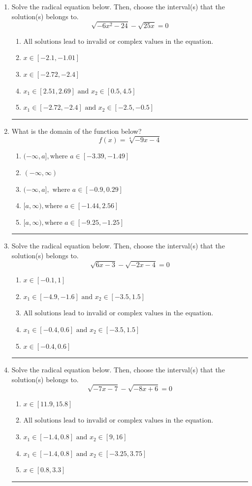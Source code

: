 \documentclass[14pt]{extbook}
\newcommand{\litem}[1]{\item#1\hspace*{-1cm}\rule{\textwidth}{0.4pt}}
\begin{document}
\begin{enumerate}
\litem{
Solve the radical equation below. Then, choose the interval(s) that the solution(s) belongs to.\[ \sqrt{-6 x^2 - 24} - \sqrt{25 x} = 0 \]\begin{enumerate}[label=\Alph*.]
\item \( \text{All solutions lead to invalid or complex values in the equation.} \)
\item \( x \in [-2.1,-1.01] \)
\item \( x \in [-2.72,-2.4] \)
\item \( x_1 \in [2.51, 2.69] \text{ and } x_2 \in [0.5,4.5] \)
\item \( x_1 \in [-2.72, -2.4] \text{ and } x_2 \in [-2.5,-0.5] \)

\end{enumerate} }
\litem{
What is the domain of the function below?\[ f(x) = \sqrt[4]{-9 x - 4} \]\begin{enumerate}[label=\Alph*.]
\item \( (-\infty, a], \text{where } a \in [-3.39, -1.49] \)
\item \( (-\infty, \infty) \)
\item \( (-\infty, a], \text{ where } a \in [-0.9, 0.29] \)
\item \( [a, \infty), \text{where } a \in [-1.44, 2.56] \)
\item \( [a, \infty), \text{where } a \in [-9.25, -1.25] \)

\end{enumerate} }
\litem{
Solve the radical equation below. Then, choose the interval(s) that the solution(s) belongs to.\[ \sqrt{6 x - 3} - \sqrt{-2 x - 4} = 0 \]\begin{enumerate}[label=\Alph*.]
\item \( x \in [-0.1,1] \)
\item \( x_1 \in [-4.9, -1.6] \text{ and } x_2 \in [-3.5,1.5] \)
\item \( \text{All solutions lead to invalid or complex values in the equation.} \)
\item \( x_1 \in [-0.4, 0.6] \text{ and } x_2 \in [-3.5,1.5] \)
\item \( x \in [-0.4,0.6] \)

\end{enumerate} }
\litem{
Solve the radical equation below. Then, choose the interval(s) that the solution(s) belongs to.\[ \sqrt{-7 x - 7} - \sqrt{-8 x + 6} = 0 \]\begin{enumerate}[label=\Alph*.]
\item \( x \in [11.9,15.8] \)
\item \( \text{All solutions lead to invalid or complex values in the equation.} \)
\item \( x_1 \in [-1.4, 0.8] \text{ and } x_2 \in [9,16] \)
\item \( x_1 \in [-1.4, 0.8] \text{ and } x_2 \in [-3.25,3.75] \)
\item \( x \in [0.8,3.3] \)


\end{enumerate}}
\end{enumerate}
\end{document}
